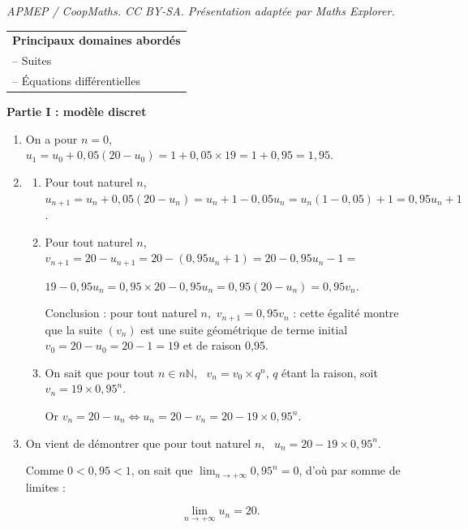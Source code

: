 \documentclass[10pt]{article}
\providecommand{\N}{\mathbb{N}}
\begin{document}
\noindent\textit{APMEP / CoopMaths. CC BY-SA. Présentation adaptée par Maths Explorer.}\par\medskip
\medskip

\begin{tabular}{|l|}\hline
\textbf{Principaux domaines abordés}\\
-- Suites\\
-- Équations différentielles\\ \hline
\end{tabular}







\bigskip

\textbf{Partie I : modèle discret}

\medskip









\medskip

\begin{enumerate}
\item 
On a pour $n = 0$, \, $u_1 = u_0 + 0,05(20 - u_0) = 1 + 0,05 \times 19 = 1 + 0,95 = 1,95$.
\item 
	\begin{enumerate}
		\item 
Pour tout naturel $n$, \, $u_{n+1} = u_n + 0,05\left(20 - u_n\right) = u_n  + 1 - 0,05u_n = u_n(1 - 0,05) + 1 = 0,95u_n + 1$.
		\item 
		

Pour tout naturel $n$, \, $v_{n+1} = 20 - u_{n+1} = 20 - \left(0,95u_n + 1\right) = 20 - 0,95u_n - 1 = $

$19 - 0,95u_n = 0,95 \times  20 - 0,95u_n = 0,95\left(20 - u_n \right) = 0,95v_n$.

Conclusion : pour tout naturel $n$,\, $v_{n+1} = 0,95v_n$ : cette égalité montre que la suite $\left(v_n\right)$ est une suite géométrique de terme initial $v_0 =  20 - u_0 =  20 - 1 = 19$ et de raison 0,95.
		\item 
On sait que pour tout $n \in n\N$, \, $v_n = v_0 \times q^n$, $q$ étant la raison, soit $v_n = 19  \times 0,95^n$.

Or $v_n = 20 - u_n \iff u_n = 20 - v_n = 20 - 19 \times 0,95^n$.
	\end{enumerate}
\item 
On vient de démontrer que pour tout naturel $n$, \, $u_n = 20 - 19\times 0,95^n$.

Comme $0 < 0,95 < 1$, on sait que $\displaystyle\lim_{n \to + \infty} 0,95^n = 0$, d'où par somme de limites :

\[\displaystyle\lim_{n \to + \infty} u_n = 20.\]
\end{enumerate}
\end{document}
